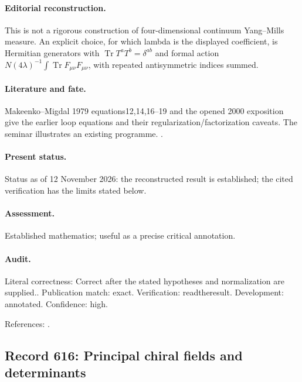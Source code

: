 \paragraph{Editorial reconstruction.} This is not a rigorous construction of four-dimensional continuum Yang--Mills measure. An explicit choice, for which lambda is the displayed coefficient, is Hermitian generators with $\operatorname{Tr}T^aT^b=\delta^{ab}$ and formal action $N(4\lambda)^{-1}\int\operatorname{Tr}F_{\mu\nu}F_{\mu\nu}$, with repeated antisymmetric indices summed.

\paragraph{Literature and fate.} Makeenko--Migdal 1979 equations12,14,16--19 and the opened 2000 exposition give the earlier loop equations and their regularization/factorization caveats. The seminar illustrates an existing programme. \citep{makeenkomigdal1979exact,makeenko2000large}.

\paragraph{Present status.} Status as of 12 November 2026: the reconstructed result is established; the cited verification has the limits stated below.

\paragraph{Assessment.} Established mathematics; useful as a precise critical annotation.

\paragraph{Audit.} Literal correctness: Correct after the stated hypotheses and normalization are supplied.. Publication match: exact. Verification: readtheresult. Development: annotated. Confidence: high.

\noindent References: \citep{makeenkomigdal1979exact,makeenko2000large}.\par

\subsection{Record 616: Principal chiral fields and determinants}

\label{talk:616}

